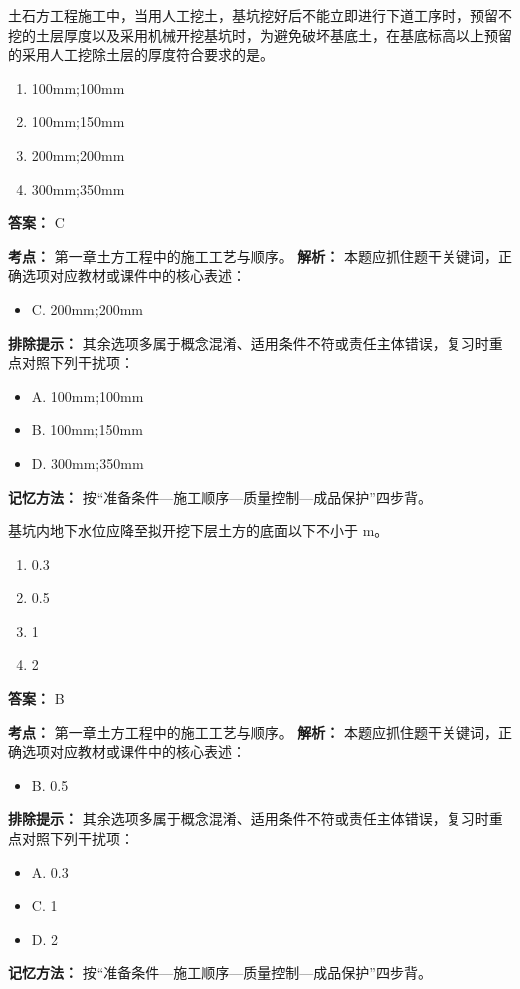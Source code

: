 \documentclass[UTF8,fontset=fandol,11pt]{ctexart}
\begin{document}
\begin{quizbox}[title={第 15 题}]
土石方工程施工中，当用人工挖土，基坑挖好后不能立即进行下道工序时，预留不挖的土层厚度以及采用机械开挖基坑时，为避免破坏基底土，在基底标高以上预留的采用人工挖除土层的厚度符合要求的是。\\
\begin{enumerate}[label=\Alph*.]
\item 100mm;100mm
\item 100mm;150mm
\item 200mm;200mm
\item 300mm;350mm
\end{enumerate}
\textbf{答案：} C
\vspace{0.25em}
\begin{answerbox}[title={考点解析}]
\textbf{考点：} 第一章土方工程中的施工工艺与顺序。
\textbf{解析：} 本题应抓住题干关键词，正确选项对应教材或课件中的核心表述：
\begin{itemize}
\item C. 200mm;200mm
\end{itemize}
\textbf{排除提示：} 其余选项多属于概念混淆、适用条件不符或责任主体错误，复习时重点对照下列干扰项：
\begin{itemize}
\item A. 100mm;100mm
\item B. 100mm;150mm
\item D. 300mm;350mm
\end{itemize}
\textbf{记忆方法：} 按“准备条件—施工顺序—质量控制—成品保护”四步背。
\end{answerbox}
\end{quizbox}

\vspace{0.2em}

\begin{quizbox}[title={第 16 题}]
基坑内地下水位应降至拟开挖下层土方的底面以下不小于 m。\\
\begin{enumerate}[label=\Alph*.]
\item 0.3
\item 0.5
\item 1
\item 2
\end{enumerate}
\textbf{答案：} B
\vspace{0.25em}
\begin{answerbox}[title={考点解析}]
\textbf{考点：} 第一章土方工程中的施工工艺与顺序。
\textbf{解析：} 本题应抓住题干关键词，正确选项对应教材或课件中的核心表述：
\begin{itemize}
\item B. 0.5
\end{itemize}
\textbf{排除提示：} 其余选项多属于概念混淆、适用条件不符或责任主体错误，复习时重点对照下列干扰项：
\begin{itemize}
\item A. 0.3
\item C. 1
\item D. 2
\end{itemize}
\textbf{记忆方法：} 按“准备条件—施工顺序—质量控制—成品保护”四步背。
\end{answerbox}
\end{quizbox}
\end{document}
